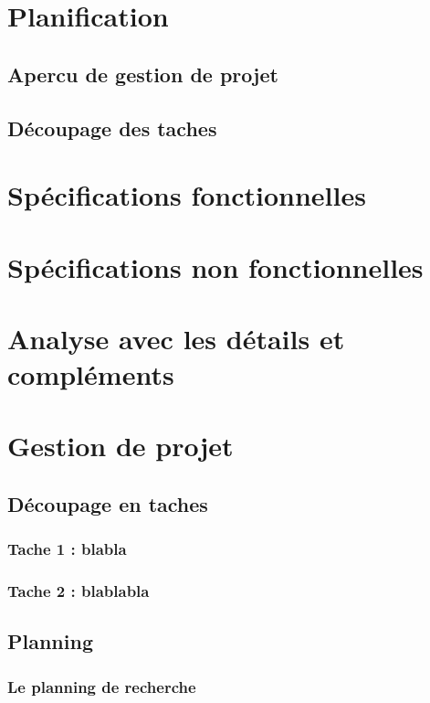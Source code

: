 \documentclass{polytech/polytech}
\begin{document}
    
    
    \appendix   
    
    \chapter{Planification}
    
        \section{Apercu de gestion de projet}
        \section{Découpage des taches}
    
    \chapter{Spécifications fonctionnelles}
    
    \chapter{Spécifications non fonctionnelles}
    
    \chapter{Analyse avec les détails et compléments}
    
    \chapter{Gestion de projet}
    
        \section{Découpage en taches}
        \subsection{Tache 1 : blabla}
        \subsection{Tache 2 : blablabla}
        \section{Planning}
        \subsection{Le planning de recherche}
\end{document}
